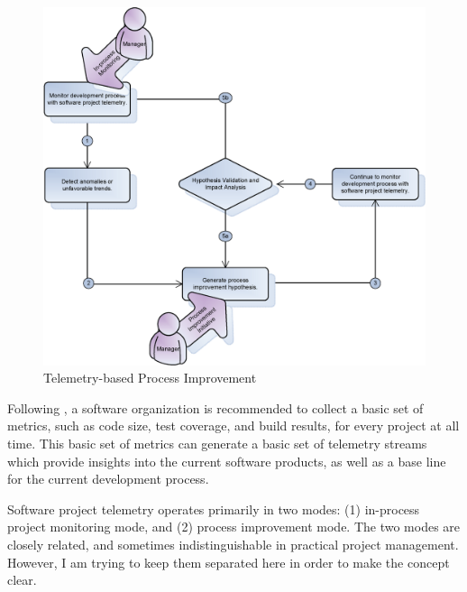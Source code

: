 \begin{figure}[p]
  \includegraphics[width=1.00\textwidth]{figures/TelemetryProcess}
  \caption{Telemetry-based Process Improvement} 
  \label{fig:TelemetryBasedProcessImprovement}
\end{figure}


Following \cite{Hetzel:1993}, a software organization is recommended to collect a basic set of metrics, such as code size, test coverage, and build results, for every project at all time. This basic set of metrics can generate a basic set of telemetry streams which provide insights into the current software products, as well as a base line for the current development process.

Software project telemetry operates primarily in two modes: (1) in-process project monitoring mode, and (2) process improvement mode. The two modes are closely related, and sometimes indistinguishable in practical project management. However, I am trying to keep them separated here in order to make the concept clear. 


